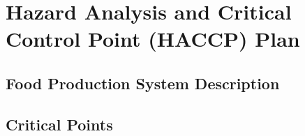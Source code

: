 \section{Hazard Analysis and Critical Control Point (HACCP) Plan}



\subsection{Food Production System Description}


\subsection{Critical Points}





